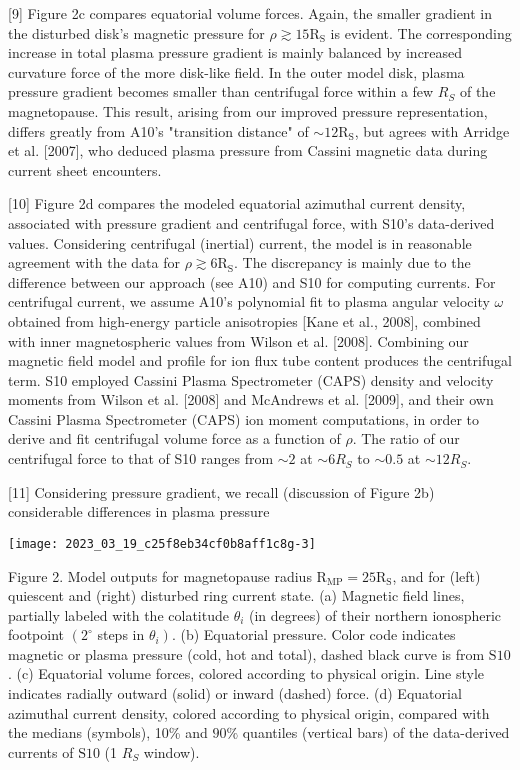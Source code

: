 \documentclass[10pt]{article}
\begin{document}
[9] Figure 2c compares equatorial volume forces. Again, the smaller gradient in the disturbed disk's magnetic pressure for $\rho \gtrsim 15 \mathrm{R}_{\mathrm{S}}$ is evident. The corresponding increase in total plasma pressure gradient is mainly balanced by increased curvature force of the more disk-like field. In the outer model disk, plasma pressure gradient becomes smaller than centrifugal force within a few $R_{S}$ of the magnetopause. This result, arising from our improved pressure representation, differs greatly from A10's "transition distance" of $\sim 12 \mathrm{R}_{\mathrm{S}}$, but agrees with Arridge et al. [2007], who deduced plasma pressure from Cassini magnetic data during current sheet encounters.

[10] Figure 2d compares the modeled equatorial azimuthal current density, associated with pressure gradient and centrifugal force, with S10's data-derived values. Considering centrifugal (inertial) current, the model is in reasonable agreement with the data for $\rho \gtrsim 6 \mathrm{R}_{\mathrm{S}}$. The discrepancy is mainly due to the difference between our approach (see A10) and S10 for computing currents. For centrifugal current, we assume A10's polynomial fit to plasma angular velocity $\omega$ obtained from high-energy particle anisotropies [Kane et al., 2008], combined with inner magnetospheric values from Wilson et al. [2008]. Combining our magnetic field model and profile for ion flux tube content produces the centrifugal term. S10 employed Cassini Plasma Spectrometer (CAPS) density and velocity moments from Wilson et al. [2008] and McAndrews et al. [2009], and their own Cassini Plasma Spectrometer (CAPS) ion moment computations, in order to derive and fit centrifugal volume force as a function of $\rho$. The ratio of our centrifugal force to that of S10 ranges from $\sim 2$ at $\sim 6 R_{S}$ to $\sim 0.5$ at $\sim 12 R_{S}$.

[11] Considering pressure gradient, we recall (discussion of Figure 2b) considerable differences in plasma pressure

\begin{center}
\texttt{[image: 2023\_03\_19\_c25f8eb34cf0b8aff1c8g-3]}
\end{center}

Figure 2. Model outputs for magnetopause radius $\mathrm{R}_{\mathrm{MP}}=25 \mathrm{R}_{\mathrm{S}}$, and for (left) quiescent and (right) disturbed ring current state. (a) Magnetic field lines, partially labeled with the colatitude $\theta_{i}$ (in degrees) of their northern ionospheric footpoint $\left(2^{\circ}\right.$ steps in $\left.\theta_{i}\right)$. (b) Equatorial pressure. Color code indicates magnetic or plasma pressure (cold, hot and total), dashed black curve is from $\mathrm{S} 10$. (c) Equatorial volume forces, colored according to physical origin. Line style indicates radially outward (solid) or inward (dashed) force. (d) Equatorial azimuthal current density, colored according to physical origin, compared with the medians (symbols), 10\% and $90 \%$ quantiles (vertical bars) of the data-derived currents of $\mathrm{S} 10$ (1 $R_{S}$ window).
\end{document}
